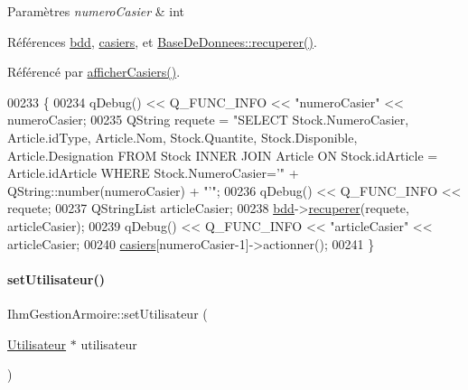 \begin{DoxyParams}{Paramètres}
{\em numero\+Casier} & int \\
\hline
\end{DoxyParams}


Références \hyperlink{class_ihm_gestion_armoire_ad0d3a89bbcfa9f0e50ff5c50ec64d707}{bdd}, \hyperlink{class_ihm_gestion_armoire_acd01a783a46b27a1b8d1535f5ce16212}{casiers}, et \hyperlink{class_base_de_donnees_a77539baad389f5acf754cd2cd452403e}{Base\+De\+Donnees\+::recuperer()}.



Référencé par \hyperlink{class_ihm_gestion_armoire_a04201173bd9ac135227ac56a6c22a999}{afficher\+Casiers()}.


\begin{DoxyCode}
00233 \{
00234     qDebug() << Q\_FUNC\_INFO << \textcolor{stringliteral}{"numeroCasier"} << numeroCasier;
00235     QString requete = \textcolor{stringliteral}{"SELECT Stock.NumeroCasier, Article.idType, Article.Nom, Stock.Quantite,
       Stock.Disponible, Article.Designation FROM Stock INNER JOIN Article ON Stock.idArticle = Article.idArticle WHERE
       Stock.NumeroCasier='"} + QString::number(numeroCasier) + \textcolor{stringliteral}{"'"};
00236     qDebug() << Q\_FUNC\_INFO << requete;
00237     QStringList articleCasier;
00238     \hyperlink{class_ihm_gestion_armoire_ad0d3a89bbcfa9f0e50ff5c50ec64d707}{bdd}->\hyperlink{class_base_de_donnees_a77539baad389f5acf754cd2cd452403e}{recuperer}(requete, articleCasier);
00239     qDebug() << Q\_FUNC\_INFO << \textcolor{stringliteral}{"articleCasier"} << articleCasier;
00240     \hyperlink{class_ihm_gestion_armoire_acd01a783a46b27a1b8d1535f5ce16212}{casiers}[numeroCasier-1]->actionner();
00241 \}
\end{DoxyCode}
\mbox{\label{class_ihm_gestion_armoire_af63a0c4424edd90a3c45506dde527b4e}} 
\paragraph{\texorpdfstring{set\+Utilisateur()}{setUtilisateur()}}
{\footnotesize\ttfamily Ihm\+Gestion\+Armoire\+::set\+Utilisateur (\begin{DoxyParamCaption}\item[{\hyperlink{class_utilisateur}{Utilisateur} $\ast$}]{utilisateur }\end{DoxyParamCaption})}


